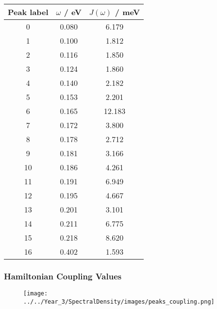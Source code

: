 \begin{table}
    \centering
    \begin{tabular}{||c c c||}
        \hline
        Peak label & $\omega$ / eV & $J\left(\omega\right)$ / meV \\
        \hline\hline
        
         0 & 0.080 & 6.179 \\
         1 & 0.100 & 1.812 \\
         2 & 0.116 & 1.850 \\
         3 & 0.124 & 1.860 \\
         4 & 0.140 & 2.182 \\
         5 & 0.153 & 2.201 \\
         6 & 0.165 & 12.183 \\
         7 & 0.172 & 3.800 \\
         8 & 0.178 & 2.712 \\
         9 & 0.181 & 3.166 \\
         10 & 0.186 & 4.261 \\
         11 & 0.191 & 6.949 \\
         12 & 0.195 & 4.667 \\
         13 & 0.201 & 3.101 \\
         14 & 0.211 & 6.775 \\
         15 & 0.218 & 8.620 \\
         16 & 0.402 & 1.593 \\
        \hline 
    \end{tabular}
\end{table}

\afterpartskip
\subsubsection{Hamiltonian Coupling Values}
\label{subsubsec:specdens_coupling}

\begin{figure}
    \centering
    \texttt{[image: ../../Year\_3/SpectralDensity/images/peaks\_coupling.png]}
\end{figure}

